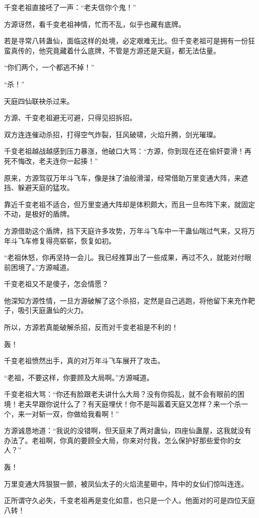 \begin{this_body}
千变老祖直接呸了一声：“老夫信你个鬼！”

方源讶然，看千变老祖神情，忙而不乱，似乎也藏有底牌。

若是寻常八转蛊仙，面临这样的处境，必定艰难无比。但千变老祖可是拥有一份狂蛮真传的，他究竟藏着什么底牌，不管是方源还是天庭，都无法估量。

“你们两个，一个都逃不掉！”

“杀！”

天庭四仙联袂杀过来。

方源、千变老祖避无可避，只得见招拆招。

双方连连催动杀招，打得空气炸裂，狂风破啸，火焰升腾，剑光璀璨。

千变老祖越战越感到压力暴涨，他破口大骂：“方源，你到现在还在偷奸耍滑！再死不悔改，老夫连你一起揍！”

原来，方源驾驭万年斗飞车，像是抹了油般滑溜，经常借助万里变通大阵，来遮挡、躲避天庭的猛攻。

靠近千变老祖不适合，但万里变通大阵却是体积颇大，而且一旦布阵下来，就固定不动，是极好的盾牌。

方源借助这个盾牌，挡下天庭许多攻势，万年斗飞车中一干蛊仙喘过气来，又将万年斗飞车修复得亮崭崭，恢复如初。

“老祖休怒，你再坚持一会儿。我已经推算出了一些成果，再过不久，就能对付眼前困境了。”方源喊道。

千变老祖又不是傻子，怎会情愿？

他深知方源性情，一旦方源破解了这个杀招，定然是自己逃跑，将他留下来充作靶子，吸引天庭蛊仙的火力。

所以，方源若真能破解杀招，反而对千变老祖是不利的！

轰！

千变老祖愤然出手，真的对万年斗飞车展开了攻击。

“老祖，不要这样，你要顾及大局啊。”方源喊道。

千变老祖大骂：“你还有脸跟老夫讲什么大局？没有你捣乱，就不会有眼前的困境！老夫早跟你说什么了？有天庭埋伏！你不是叫嚣着天庭又怎样？来一个杀一个，来一对斩一双，你做给我看啊！”

方源诚恳地道：“我说的没错啊，但天庭来了两对蛊仙，四座仙蛊屋，这我就没有办法了。老祖啊，你真的要顾全大局，你来对付我，怎么保护好那些爱你的女人？”

轰！

万里变通大阵狠狠一颤，被凤仙太子的火焰流星砸中，阵中的女仙们惊叫连连。

正所谓守久必失，千变老祖再是变化如意，也只是一个人。他面对的可是四位天庭八转！


\end{this_body}
